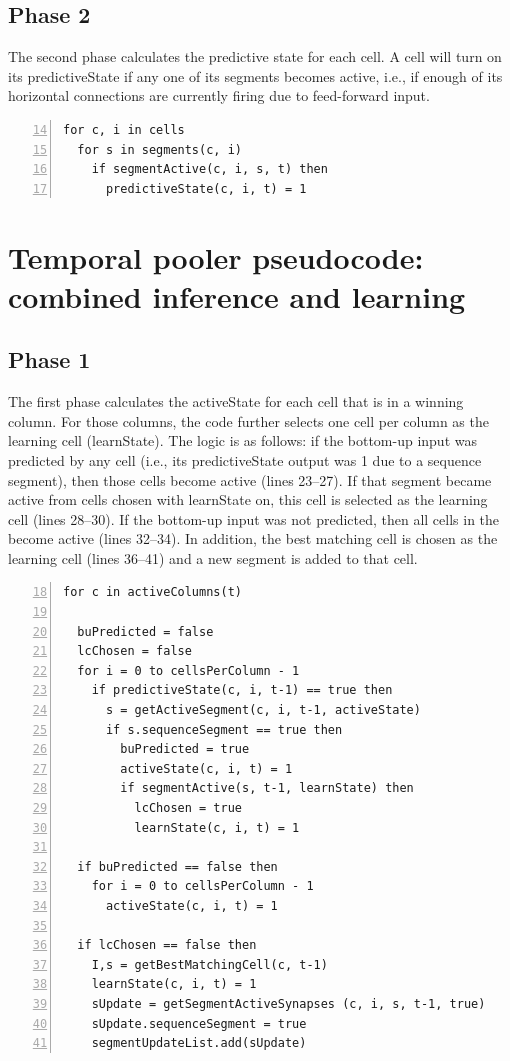 \documentclass{report}
\begin{document}
\subsection*{Phase 2}
The second phase calculates the predictive state for each cell. A cell
will turn on its predictiveState if any one of its segments becomes
active, i.e., if enough of its horizontal connections are currently
firing due to feed-forward input.

\begin{lstlisting}[numbers=left,firstnumber=14]
for c, i in cells
  for s in segments(c, i)
    if segmentActive(c, i, s, t) then
      predictiveState(c, i, t) = 1
\end{lstlisting}

\section*{Temporal pooler pseudocode: combined inference and learning}

\subsection*{Phase 1}

The first phase calculates the activeState for each cell that is in a
winning column. For those columns, the code further selects one cell
per column as the learning cell (learnState). The logic is as follows:
if the bottom-up input was predicted by any cell (i.e., its
predictiveState output was 1 due to a sequence segment), then those
cells become active (lines 23--27). If that segment became active from
cells chosen with learnState on, this cell is selected as the learning
cell (lines 28--30). If the bottom-up input was not predicted, then
all cells in the become active (lines 32--34). In addition, the best
matching cell is chosen as the learning cell (lines 36--41) and a new
segment is added to that cell.

\begin{lstlisting}[numbers=left,firstnumber=18]
for c in activeColumns(t)

  buPredicted = false
  lcChosen = false
  for i = 0 to cellsPerColumn - 1
    if predictiveState(c, i, t-1) == true then
      s = getActiveSegment(c, i, t-1, activeState)
      if s.sequenceSegment == true then
        buPredicted = true
        activeState(c, i, t) = 1
        if segmentActive(s, t-1, learnState) then
          lcChosen = true
          learnState(c, i, t) = 1

  if buPredicted == false then
    for i = 0 to cellsPerColumn - 1
      activeState(c, i, t) = 1

  if lcChosen == false then
    I,s = getBestMatchingCell(c, t-1)
    learnState(c, i, t) = 1
    sUpdate = getSegmentActiveSynapses (c, i, s, t-1, true)
    sUpdate.sequenceSegment = true
    segmentUpdateList.add(sUpdate)
\end{lstlisting}
\end{document}

